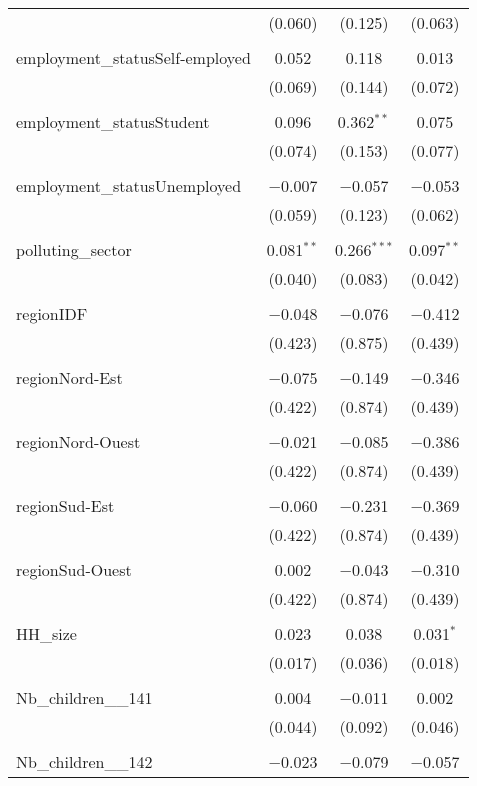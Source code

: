 \begin{tabular}{@{\extracolsep{5pt}}lccc}
  & (0.060) & (0.125) & (0.063) \\ 
  & & & \\ 
 employment\_statusSelf-employed & 0.052 & 0.118 & 0.013 \\ 
  & (0.069) & (0.144) & (0.072) \\ 
  & & & \\ 
 employment\_statusStudent & 0.096 & 0.362$^{**}$ & 0.075 \\ 
  & (0.074) & (0.153) & (0.077) \\ 
  & & & \\ 
 employment\_statusUnemployed & $-$0.007 & $-$0.057 & $-$0.053 \\ 
  & (0.059) & (0.123) & (0.062) \\ 
  & & & \\ 
 polluting\_sector & 0.081$^{**}$ & 0.266$^{***}$ & 0.097$^{**}$ \\ 
  & (0.040) & (0.083) & (0.042) \\ 
  & & & \\ 
 regionIDF & $-$0.048 & $-$0.076 & $-$0.412 \\ 
  & (0.423) & (0.875) & (0.439) \\ 
  & & & \\ 
 regionNord-Est & $-$0.075 & $-$0.149 & $-$0.346 \\ 
  & (0.422) & (0.874) & (0.439) \\ 
  & & & \\ 
 regionNord-Ouest & $-$0.021 & $-$0.085 & $-$0.386 \\ 
  & (0.422) & (0.874) & (0.439) \\ 
  & & & \\ 
 regionSud-Est & $-$0.060 & $-$0.231 & $-$0.369 \\ 
  & (0.422) & (0.874) & (0.439) \\ 
  & & & \\ 
 regionSud-Ouest & 0.002 & $-$0.043 & $-$0.310 \\ 
  & (0.422) & (0.874) & (0.439) \\ 
  & & & \\ 
 HH\_size & 0.023 & 0.038 & 0.031$^{*}$ \\ 
  & (0.017) & (0.036) & (0.018) \\ 
  & & & \\ 
 Nb\_children\_\_141 & 0.004 & $-$0.011 & 0.002 \\ 
  & (0.044) & (0.092) & (0.046) \\ 
  & & & \\ 
 Nb\_children\_\_142 & $-$0.023 & $-$0.079 & $-$0.057 \\ 

\end{tabular}
